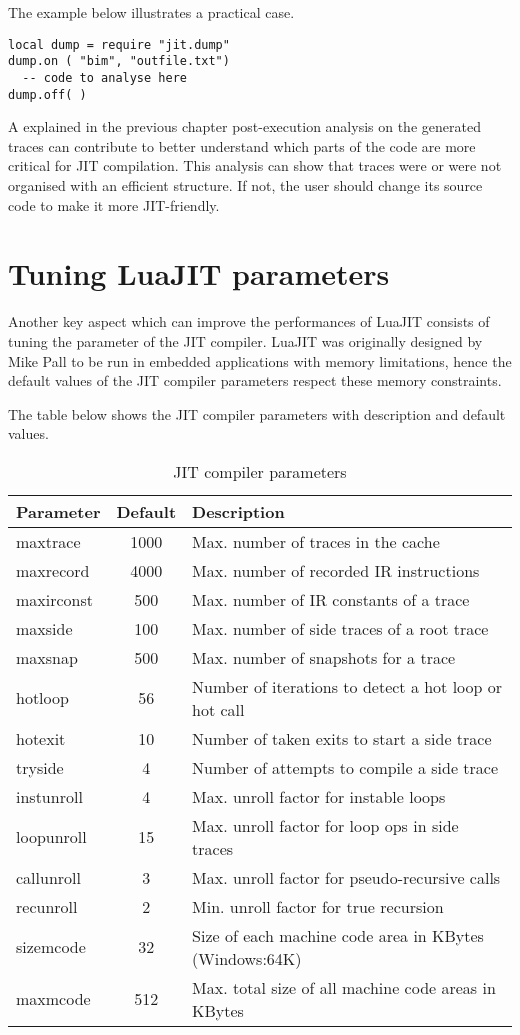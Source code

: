 The example below illustrates a practical case.

\begin{lstlisting}[style=CommandsLuaJIT]
local dump = require "jit.dump"
dump.on ( "bim", "outfile.txt")
  -- code to analyse here
dump.off( )
\end{lstlisting}

\noindent
A explained in the previous chapter post-execution analysis on the generated traces can contribute to better understand which parts of the code are more critical for JIT compilation. This analysis can show that traces were or were not organised with an efficient structure. If not, the user should change its source code to make it more JIT-friendly.

\section{Tuning LuaJIT parameters}
Another key aspect which can improve the performances of LuaJIT consists of tuning the parameter of the JIT compiler. LuaJIT was originally designed by Mike Pall to be run in embedded applications with memory limitations, hence the default values of the JIT compiler parameters respect these memory constraints. 

The table below shows the JIT compiler parameters with description and default values.
\begin{table}[H]
\centering
\begin{tabular}{|l|c|l|} 
 \hline
 \textbf{Parameter} & \textbf{Default}  & \textbf{Description} \\
 \hline
 maxtrace	& 1000	& Max. number of traces in the cache\\
 maxrecord	& 4000	& Max. number of recorded IR instructions\\
 maxirconst	& 500	& Max. number of IR constants of a trace\\
 maxside	& 100	& Max. number of side traces of a root trace\\
 maxsnap	& 500	& Max. number of snapshots for a trace\\
 hotloop	& 56	& Number of iterations to detect a hot loop or hot call\\
 hotexit	& 10	& Number of taken exits to start a side trace\\
 tryside	& 4	& Number of attempts to compile a side trace\\
 instunroll	& 4	& Max. unroll factor for instable loops\\
 loopunroll	& 15	& Max. unroll factor for loop ops in side traces\\
 callunroll	& 3	& Max. unroll factor for pseudo-recursive calls\\
 recunroll	& 2	& Min. unroll factor for true recursion\\
 sizemcode	& 32	& Size of each machine code area in KBytes (Windows:64K)\\
 maxmcode	& 512	& Max. total size of all machine code areas in KBytes\\
 \hline
\end{tabular}
\caption{JIT compiler parameters}
\end{table}


